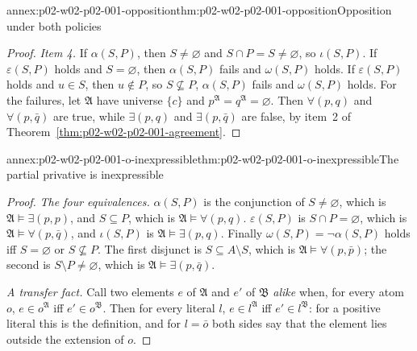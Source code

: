 \begin{annexitem}{annex:p02-w02-p02-001-opposition}{thm:p02-w02-p02-001-opposition}{Opposition under both policies}
\begin{proof}
\emph{Item 4.} If \(\alpha(S,P)\), then \(S\ne\varnothing\) and
\(S\cap P=S\ne\varnothing\), so \(\iota(S,P)\). If \(\varepsilon(S,P)\)
holds and \(S=\varnothing\), then \(\alpha(S,P)\) fails and \(\omega(S,P)\)
holds. If \(\varepsilon(S,P)\) holds and \(u\in S\), then \(u\notin P\), so
\(S\not\subseteq P\), \(\alpha(S,P)\) fails and \(\omega(S,P)\) holds.
For the failures, let \(\mathfrak A\) have universe \(\{c\}\) and
\(p^{\mathfrak A}=q^{\mathfrak A}=\varnothing\). Then \(\forall(p,q)\) and
\(\forall(p,\bar q)\) are true, while \(\exists(p,q)\) and
\(\exists(p,\bar q)\) are false, by item~2 of
Theorem~\ref{thm:p02-w02-p02-001-agreement}.
\end{proof}
\end{annexitem}

\begin{annexitem}{annex:p02-w02-p02-001-o-inexpressible}{thm:p02-w02-p02-001-o-inexpressible}{The partial privative is inexpressible}
\begin{proof}
\emph{The four equivalences.} \(\alpha(S,P)\) is the conjunction of
\(S\ne\varnothing\), which is \(\mathfrak A\models\exists(p,p)\), and
\(S\subseteq P\), which is \(\mathfrak A\models\forall(p,q)\).
\(\varepsilon(S,P)\) is \(S\cap P=\varnothing\), which is
\(\mathfrak A\models\forall(p,\bar q)\), and \(\iota(S,P)\) is
\(\mathfrak A\models\exists(p,q)\). Finally \(\omega(S,P)=\neg\alpha(S,P)\)
holds iff \(S=\varnothing\) or \(S\not\subseteq P\). The first disjunct is
\(S\subseteq A\setminus S\), which is \(\mathfrak A\models\forall(p,\bar p)\);
the second is \(S\setminus P\ne\varnothing\), which is
\(\mathfrak A\models\exists(p,\bar q)\).

\emph{A transfer fact.} Call two elements \(e\) of \(\mathfrak A\) and
\(e'\) of \(\mathfrak B\) \emph{alike} when, for every atom \(o\),
\(e\in o^{\mathfrak A}\) iff \(e'\in o^{\mathfrak B}\). Then for every literal
\(l\), \(e\in l^{\mathfrak A}\) iff \(e'\in l^{\mathfrak B}\): for a positive
literal this is the definition, and for \(l=\bar o\) both sides say that
the element lies outside the extension of \(o\).


\end{proof}
\end{annexitem}
